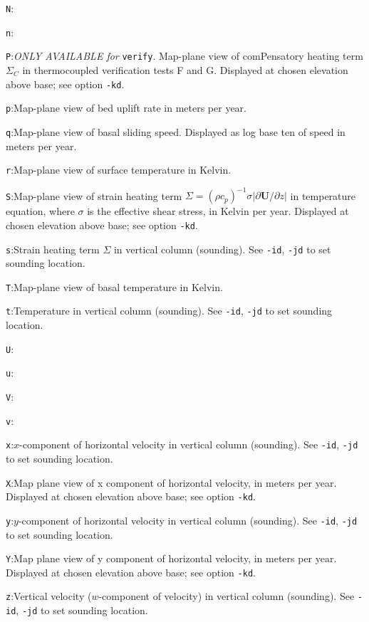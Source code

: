 \documentclass[final]{amsart}
\renewcommand{\t}[1]{\texttt{#1}}
\newcommand{\bU}{\mathbf{U}}
\begin{document}
\verb|N|:\quad

\verb|n|:\quad

\verb|P|:\quad \emph{ONLY AVAILABLE for }\t{verify}.  Map-plane view of comPensatory heating term $\Sigma_C$ in thermocoupled verification tests F and G.  Displayed at chosen elevation above base; see option \verb|-kd|.

\verb|p|:\quad Map-plane view of bed uplift rate in meters per year.

\verb|q|:\quad Map-plane view of basal sliding speed.  Displayed as log base ten of speed in meters per year.

\verb|r|:\quad Map-plane view of surface temperature in Kelvin.

\verb|S|:\quad Map-plane view of strain heating term $\Sigma=(\rho c_p)^{-1}\sigma |\partial \bU/\partial z|$ in temperature equation, where $\sigma$ is the effective shear stress, in Kelvin per year.  Displayed at chosen elevation above base; see option \verb|-kd|.

\verb|s|:\quad Strain heating term $\Sigma$ in vertical column (sounding).  See \verb|-id|, \verb|-jd| to set sounding location.

\verb|T|:\quad Map-plane view of basal temperature in Kelvin.

\verb|t|:\quad Temperature in vertical column (sounding).  See \verb|-id|, \verb|-jd| to set sounding location.

\verb|U|:\quad

\verb|u|:\quad

\verb|V|:\quad

\verb|v|:\quad

\verb|x|:\quad $x$-component of horizontal velocity in vertical column (sounding).  See \verb|-id|, \verb|-jd| to set sounding location.

\verb|X|:\quad Map plane view of x component of horizontal velocity, in meters per year.  Displayed at chosen elevation above base; see option \verb|-kd|.

\verb|y|:\quad $y$-component of horizontal velocity in vertical column (sounding).  See \verb|-id|, \verb|-jd| to set sounding location.

\verb|Y|:\quad Map plane view of y component of horizontal velocity, in meters per year.  Displayed at chosen elevation above base; see option \verb|-kd|.

\verb|z|:\quad Vertical velocity ($w$-component of velocity) in vertical column (sounding).  See \verb|-id|, \verb|-jd| to set sounding location.
\end{document}
